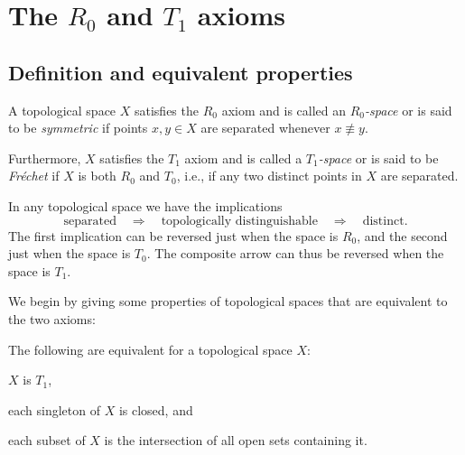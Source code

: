 \documentclass[article, a4paper, 11pt, oneside]{memoir}
\numberwithin{equation}{chapter}
\renewcommand{\implies}{\Rightarrow}
\begin{document}



\chapter[The R0 and T1 axioms][The $R_0$ and $T_1$ axioms]{The $R_0$ and $T_1$ axioms}

\section{Definition and equivalent properties}

\begin{definition}
    A topological space $X$ satisfies the $R_0$ axiom and is called an \emph{$R_0$-space} or is said to be \emph{symmetric} if points $x,y \in X$ are separated whenever $x \not\equiv y$.
    
    Furthermore, $X$ satisfies the $T_1$ axiom and is called a \emph{$T_1$-space} or is said to be \emph{Fréchet} if $X$ is both $R_0$ and $T_0$, i.e., if any two distinct points in $X$ are separated.
\end{definition}
%
In any topological space we have the implications
%
\begin{equation*}
    \text{separated}
        \quad \implies \quad
        \text{topologically distinguishable}
        \quad \implies \quad
        \text{distinct}.
\end{equation*}
%
The first implication can be reversed just when the space is $R_0$, and the second just when the space is $T_0$. The composite arrow can thus be reversed when the space is $T_1$.

We begin by giving some properties of topological spaces that are equivalent to the two axioms:

\begin{proposition}
    The following are equivalent for a topological space $X$:
    \begin{enumprop}
        \item \label{enum:T1-space} $X$ is $T_1$,
        \item \label{enum:T1-singletons-closed} each singleton of $X$ is closed, and
        \item \label{enum:T1-intersection-of-open-sets} each subset of $X$ is the intersection of all open sets containing it.
    \end{enumprop}
\end{proposition}
\end{document}

